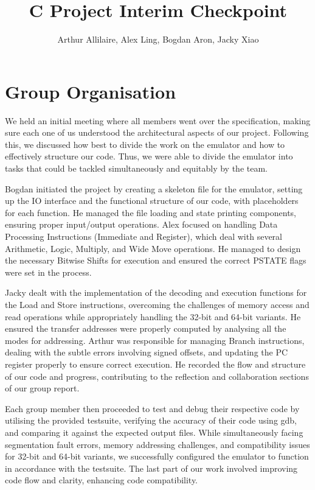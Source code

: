 \documentclass[11pt]{article}
\begin{document}
\title{C Project Interim Checkpoint}
\author{Arthur Allilaire, Alex Ling, Bogdan Aron, Jacky Xiao}

\maketitle

\section{Group Organisation}

We held an initial meeting where all members went over the specification, making sure each one of us understood the architectural aspects of our project. Following this, we discussed how best to divide the work on the emulator and how to effectively structure our code. Thus, we were able to divide the emulator into tasks that could be tackled simultaneously and equitably by the team.

Bogdan initiated the project by creating a skeleton file for the emulator, setting up the IO interface and the functional structure of our code, with placeholders for each function. He managed the file loading and state printing components, ensuring proper input/output operations. Alex focused on handling Data Processing Instructions (Immediate and Register), which deal with several Arithmetic, Logic, Multiply, and Wide Move operations. He managed to design the necessary Bitwise Shifts for execution and ensured the correct PSTATE flags were set in the process.

Jacky dealt with the implementation of the decoding and execution functions for the Load and Store instructions, overcoming the challenges of memory access and read operations while appropriately handling the 32-bit and 64-bit variants. He ensured the transfer addresses were properly computed by analysing all the modes for addressing. Arthur was responsible for managing Branch instructions, dealing with the subtle errors involving signed offsets, and updating the PC register properly to ensure correct execution. He recorded the flow and structure of our code and progress, contributing to the reflection and collaboration sections of our group report.

Each group member then proceeded to test and debug their respective code by utilising the provided testsuite, verifying the accuracy of their code using gdb, and comparing it against the expected output files. While simultaneously facing segmentation fault errors, memory addressing challenges, and compatibility issues for 32-bit and 64-bit variants, we successfully configured the emulator to function in accordance with the testsuite. The last part of our work involved improving code flow and clarity, enhancing code compatibility.
\end{document}
